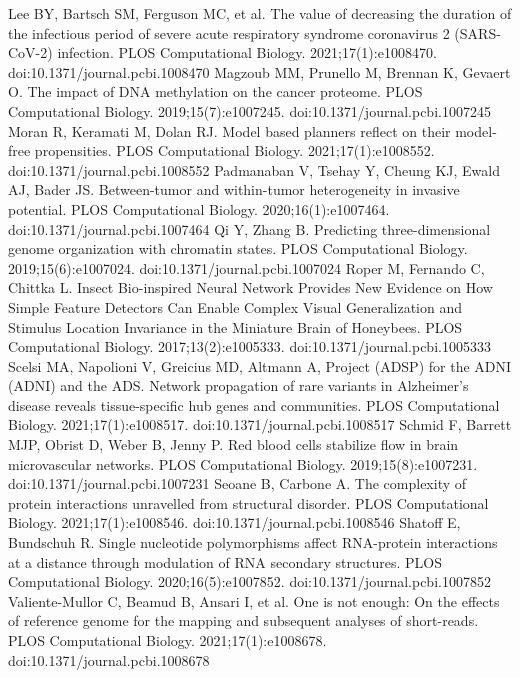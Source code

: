 \documentclass [11pt]{article}
\begin{document}
\begin{thebibliography}{99}
Lee BY, Bartsch SM, Ferguson MC, et al. The value of decreasing the duration of the infectious period of severe acute respiratory syndrome coronavirus 2 (SARS-CoV-2) infection. PLOS Computational Biology. 2021;17(1):e1008470. doi:10.1371/journal.pcbi.1008470
Magzoub MM, Prunello M, Brennan K, Gevaert O. The impact of DNA methylation on the cancer proteome. PLOS Computational Biology. 2019;15(7):e1007245. doi:10.1371/journal.pcbi.1007245
Moran R, Keramati M, Dolan RJ. Model based planners reflect on their model-free propensities. PLOS Computational Biology. 2021;17(1):e1008552. doi:10.1371/journal.pcbi.1008552
Padmanaban V, Tsehay Y, Cheung KJ, Ewald AJ, Bader JS. Between-tumor and within-tumor heterogeneity in invasive potential. PLOS Computational Biology. 2020;16(1):e1007464. doi:10.1371/journal.pcbi.1007464
Qi Y, Zhang B. Predicting three-dimensional genome organization with chromatin states. PLOS Computational Biology. 2019;15(6):e1007024. doi:10.1371/journal.pcbi.1007024
Roper M, Fernando C, Chittka L. Insect Bio-inspired Neural Network Provides New Evidence on How Simple Feature Detectors Can Enable Complex Visual Generalization and Stimulus Location Invariance in the Miniature Brain of Honeybees. PLOS Computational Biology. 2017;13(2):e1005333. doi:10.1371/journal.pcbi.1005333
Scelsi MA, Napolioni V, Greicius MD, Altmann A, Project (ADSP)  for the ADNI (ADNI) and the ADS. Network propagation of rare variants in Alzheimer’s disease reveals tissue-specific hub genes and communities. PLOS Computational Biology. 2021;17(1):e1008517. doi:10.1371/journal.pcbi.1008517
Schmid F, Barrett MJP, Obrist D, Weber B, Jenny P. Red blood cells stabilize flow in brain microvascular networks. PLOS Computational Biology. 2019;15(8):e1007231. doi:10.1371/journal.pcbi.1007231
Seoane B, Carbone A. The complexity of protein interactions unravelled from structural disorder. PLOS Computational Biology. 2021;17(1):e1008546. doi:10.1371/journal.pcbi.1008546
Shatoff E, Bundschuh R. Single nucleotide polymorphisms affect RNA-protein interactions at a distance through modulation of RNA secondary structures. PLOS Computational Biology. 2020;16(5):e1007852. doi:10.1371/journal.pcbi.1007852
Valiente-Mullor C, Beamud B, Ansari I, et al. One is not enough: On the effects of reference genome for the mapping and subsequent analyses of short-reads. PLOS Computational Biology. 2021;17(1):e1008678. doi:10.1371/journal.pcbi.1008678

\end{thebibliography}
\end{document}
